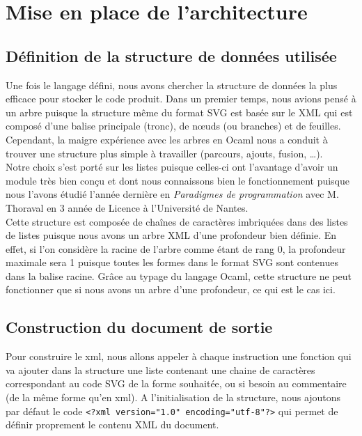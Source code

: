 	\section{Mise en place de l'architecture}
		\subsection{Définition de la structure de données utilisée}
		Une fois le langage défini, nous avons chercher la structure de données la plus efficace pour stocker le code produit. Dans un premier temps, nous avions pensé à un arbre puisque la structure même du format SVG est basée sur le XML qui est composé d'une balise principale (tronc), de nœuds (ou branches) et de feuilles. Cependant, la maigre expérience avec les arbres en Ocaml nous a conduit à trouver une structure plus simple à travailler (parcours, ajouts, fusion, \dots). \\
		
		Notre choix s'est porté sur les listes puisque celles-ci ont l'avantage d'avoir un module très bien conçu et dont nous connaissons bien le fonctionnement puisque nous l'avons étudié l'année dernière en \emph{Paradigmes de programmation} avec M. Thoraval en 3\ieme{} année de Licence à l'Université de Nantes. \\
		
		Cette structure est composée de chaînes de caractères imbriquées  dans des listes de listes puisque nous avons un arbre XML d'une profondeur bien définie. En effet, si l'on considère la racine de l'arbre comme étant de rang 0, la profondeur maximale sera 1 puisque toutes les formes dans le format SVG sont contenues dans la balise racine. Grâce au typage du langage Ocaml, cette structure ne peut fonctionner que si nous avons un arbre d'une profondeur, ce qui est le cas ici.
	 
		\subsection{Construction du document de sortie}
		Pour construire le xml, nous allons appeler à chaque instruction une fonction qui va ajouter dans la structure une liste contenant une chaine de caractères correspondant au code SVG de la forme souhaitée, ou si besoin au commentaire (de la même forme qu'en xml). A l'initialisation de la structure, nous ajoutons par défaut le code \texttt{<?xml version="1.0" encoding="utf-8"?>} qui permet de définir proprement le contenu XML du document.\\
		
